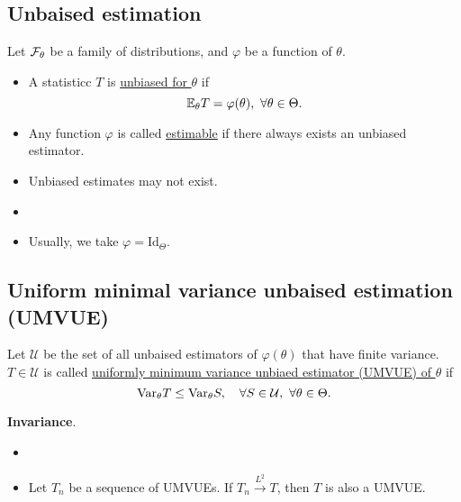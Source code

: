 \subsection{Unbaised estimation}
\begin{mydef}
	Let $\mathcal{F}_\theta$ be a family of distributions, and $\varphi$ be a function of $\theta$. 
	\begin{itemize}
		\item A statisticc $T$ is \underline{unbiased for $\theta$} if 
		$$\EE_\theta T = \varphi(\theta ), \ \forall \theta \in \Theta.$$
		
		\item Any function $\varphi$ is called \underline{estimable} if there always exists an unbiased estimator.
	\end{itemize} 
\end{mydef}
\begin{remark}\textbf{ }
	\begin{itemize}
		\item Unbiased estimates may not exist.
		\item {}
		\item Usually, we take $\varphi = \boldsymbol{\mathrm{Id}}_\Theta$. 
	\end{itemize}
\end{remark}

\subsection{Uniform minimal variance unbaised estimation (UMVUE)}
\begin{mydef}
	Let $\mathcal{U}$ be the set of all unbaised estimators of $\varphi(\theta)$ that have finite variance. $T \in \mathcal{U}$ is called \underline{uniformly minimum variance unbiaed estimator (UMVUE) of $\theta$} if
	$$\mathrm{Var}_\theta T \leq \mathrm{Var}_\theta S, \quad \forall S\in \mathcal{U},\ \forall \theta \in \Theta.$$
\end{mydef}
\begin{remark} 
	\textbf{Invariance}.
	\begin{itemize}
		\item {}
		\item Let $T_n$ be a sequence of UMVUEs. If $T_n \xrightarrow{L^2} T$, then $T$ is also a UMVUE. 
	\end{itemize}
	
\end{remark}


